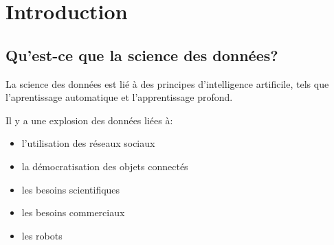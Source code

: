 \section{Introduction}
\subsection{Qu'est-ce que la science des données?}
La science des données est lié à des principes d'intelligence artificile, tels que l'aprentissage automatique et
l'apprentissage profond.


Il y a une explosion des données liées à:
\begin{itemize}
    \item l'utilisation des réseaux sociaux
    \item la démocratisation des objets connectés
    \item les besoins scientifiques
    \item les besoins commerciaux
    \item les robots
\end{itemize}
